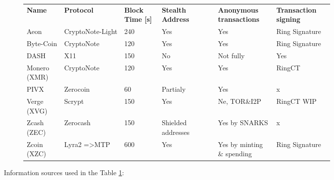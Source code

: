 \documentclass[
  printed, %
  table,   %
  lof,     %
  lot,     %
           oneside, color
]{fithesis3}
\begin{document}
\begin{figure}[H]
\centering
\begin{tabular}{p{0.1\linewidth}p{0.16\linewidth}p{0.1\linewidth}p{0.15\linewidth}p{0.15\linewidth}p{0.15\linewidth}}
\textbf{Name}        & \textbf{Protocol}                & \textbf{Block Time {[}s{]}} & \textbf{Stealth Address    }      & \textbf{Anonymous transactions} & \textbf{Transaction signing}  \\
Aeon         & CryptoNote-Light        & 240                & Yes                      & Yes                & Ring Signature \\
Byte-Coin     & CryptoNote              & 120                & Yes                      & Yes                & Ring Signature \\
DASH         & X11                     & 150                & No                       & Not fully           & Yes            \\
Monero (XMR) & CryptoNote              & 120                & Yes                      & Yes                & RingCT         \\
PIVX         & Zerocoin                & 60                 & Partialy & Yes                & x              \\
Verge (XVG)  & Scrypt                  & 150                & Yes                      & Ne, TOR\&I2P       & RingCT WIP     \\
Zcash (ZEC)  & Zerocash                & 150                & Shielded addresses  & Yes by SNARKS    & x              \\
Zcoin (XZC)  & Lyra2 =\textgreater MTP & 600                & Yes                      & Yes by minting \& spending  & Ring Signature

\end{tabular}
\label{table:monero-alternatives}


\end{figure}
\vspace{-2em}
Information sources used in the Table \ref{table:monero-alternatives}:\\ %
\end{document}
